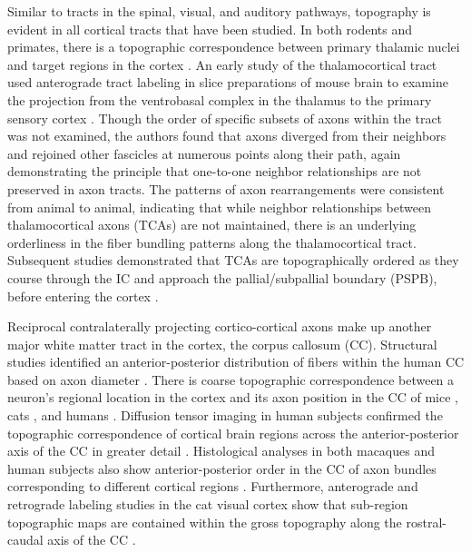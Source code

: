 Similar to tracts in the spinal, visual, and auditory pathways, topography is evident in all cortical tracts that have been studied. 
In both rodents and primates, there is a topographic correspondence between primary thalamic nuclei and target regions in the cortex \cite{caviness1980tangential,hohl1991topographical}. 
An early study of the thalamocortical tract used anterograde tract labeling in \exvivo{} slice preparations of mouse brain to examine the projection from the ventrobasal complex in the thalamus to the primary sensory cortex \cite{bernardo1987axonal}. 
Though the order of specific subsets of axons within the tract was not examined, the authors found that axons diverged from their neighbors and rejoined other fascicles at numerous points along their path, again demonstrating the principle that one-to-one neighbor relationships are not preserved in axon tracts.
The patterns of axon rearrangements were consistent from animal to animal, indicating that while neighbor relationships between thalamocortical axons (TCAs) are not maintained, there is an underlying orderliness in the fiber bundling patterns along the thalamocortical tract. 
Subsequent studies demonstrated that TCAs are topographically ordered as they course through the IC and approach the pallial/subpallial boundary (PSPB), before entering the cortex \cite{molnar1998mechanisms}.

Reciprocal contralaterally projecting cortico-cortical axons make up another major white matter tract in the cortex, the corpus callosum (CC). 
Structural studies identified an anterior-posterior distribution of fibers within the human CC based on axon diameter \cite{aboitiz1992fiber}.
There is coarse topographic correspondence between a neuron's regional location in the cortex and its axon position in the CC of mice \cite{ozaki1992prenatal}, cats \cite{nakamura1989topography}, and humans \cite{de1985topography}. 
Diffusion tensor imaging in human subjects confirmed the topographic correspondence of cortical brain regions across the anterior-posterior axis of the CC in greater detail \cite{hofer2006topography}. 
Histological analyses in both macaques and human subjects also show anterior-posterior order in the CC of axon bundles corresponding to different cortical regions \cite{caminiti2013diameter}.
Furthermore, anterograde and retrograde labeling studies in the cat visual cortex show that sub-region topographic maps are contained within the gross topography along the rostral-caudal axis of the CC \cite{payne1991visual}. 

